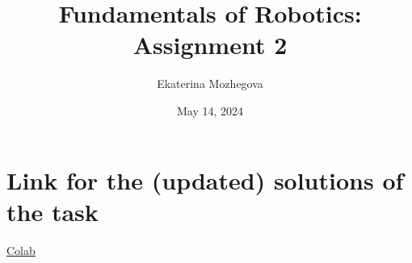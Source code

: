 \documentclass{article}
\title{Fundamentals of Robotics: Assignment 2}
\author{Ekaterina Mozhegova}
\date{May 14, 2024}
\begin{document}
\maketitle

\section{Link for the (updated) solutions of the task}

\href{https://colab.research.google.com/drive/1hU13PXIqbAtPv2cby5qNB10PobzW39JC?usp=sharing}{Colab}
\end{document}
